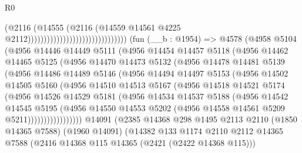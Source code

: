 \begin{lexlean}{R0}
\begin{coremodule}
                                                          (@2116
                                                            (@14555
                                                              (@2116
                                                                (@14559
                                                                  @14561
                                                                  @4225
                                                                  @2112)))))))))))))))))))))))))))))))
    (fun (__b : @1954) =>
    @4578
      (@4958
        @5104
        (@4956
          @14446
          @14449
          @5111
          (@4956
            @14454
            @14457
            @5118
            (@4956
              @14462
              @14465
              @5125
              (@4956
                @14470
                @14473
                @5132
                (@4956
                  @14478
                  @14481
                  @5139
                  (@4956
                    @14486
                    @14489
                    @5146
                    (@4956
                      @14494
                      @14497
                      @5153
                      (@4956
                        @14502
                        @14505
                        @5160
                        (@4956
                          @14510
                          @14513
                          @5167
                          (@4956
                            @14518
                            @14521
                            @5174
                            (@4956
                              @14526
                              @14529
                              @5181
                              (@4956
                                @14534
                                @14537
                                @5188
                                (@4956
                                  @14542
                                  @14545
                                  @5195
                                  (@4956
                                    @14550
                                    @14553
                                    @5202
                                    (@4956 @14558 @14561 @5209 @5211)))))))))))))))))
    @14091
    (@2385
      @14368
      @298
      @1495
      @2113
      @2110
      (@1850 @14365 @7588)
      (@1960 @14091)
      (@14382
        @133
        @1174
        @2110
        @2112
        @14365
        @7588
        (@2416 @14368 @115 @14365 (@2421 (@2422 @14368 @115)))

\end{coremodule}
\end{lexlean}
